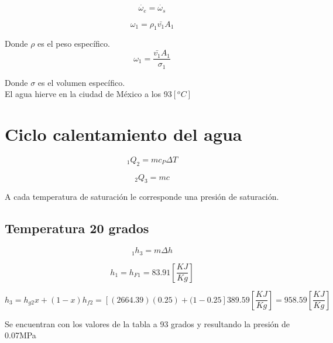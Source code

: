 \documentclass[]{article}
\begin{document}
\begin{equation}
\dot{\omega_e}=\dot{\omega_s}
\end{equation}



\begin{equation}
 \omega_1=\rho_1\bar{v_1}A_1
\end{equation}

Donde $\rho$ es el peso específico.\\

\begin{equation}
\omega_1=\frac{\bar{v_1}A_1}{\sigma_1}
\end{equation}

Donde $\sigma$ es el volumen específico.\\



El agua hierve en la ciudad de México a los 93$[^oC]$

\section{Ciclo calentamiento del agua}

\begin{equation}
   _1Q_2=mc_P\Delta T
\end{equation}

\begin{equation}
_2 Q_3=mc
\end{equation}


A cada temperatura de saturación le corresponde una presión de saturación.\\

\subsection{Temperatura 20 grados}

\begin{equation}
   _1h_3=m \Delta h
\end{equation}

\begin{equation}
   h_1=h_{F1}=83.91 [\frac{KJ}{Kg}]
\end{equation}

\begin{equation}
  h_3=h_{g2}x+(1-x)h_{f2}=[(2664.39)(0.25)+(1-0.25]389.59[\frac{KJ}{Kg}]=958.59[\frac{KJ}{Kg}]
\end{equation}

Se encuentran con los valores de la tabla a 93 grados y resultando la presión de 0.07MPa
\end{document}
